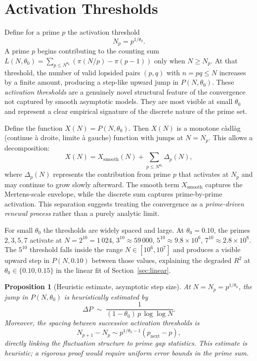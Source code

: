 \documentclass[11pt]{article}
\newtheorem{proposition}{Proposition}
\theoremstyle{definition}
\begin{document}
\section{Activation Thresholds}
\label{sec:activation}

Define for a prime \(p\) the activation threshold
\[
N_p = p^{1/\theta_0}.
\]
A prime \(p\) begins contributing to the counting sum
\(L(N,\theta_0) = \sum_{p \leq N^{\theta_0}} (\pi(N/p) - \pi(p-1))\)
only when \(N \ge N_p\).  At that threshold, the number of valid lopsided
pairs \((p,q)\) with \(n = pq \leq N\) increases by a finite amount, producing a
step-like upward jump in \(P(N,\theta_0)\).  These \emph{activation thresholds} are a
genuinely novel structural feature of the convergence not captured by smooth asymptotic
models.  They are most visible at small \(\theta_0\) and represent a clear empirical
signature of the discrete nature of the prime set.

Define the function \(X(N) = P(N,\theta_0)\).  Then \(X(N)\) is a monotone c\`adl\`ag
(continue \`a droite, limite \`a gauche) function with jumps at
\(N = N_p\).  This allows a decomposition:
\begin{equation}\label{eq:renewal}
  X(N) = X_{\text{smooth}}(N) + \sum_{p \le N^{\theta_0}} \Delta_p(N),
\end{equation}
where \(\Delta_p(N)\) represents the contribution from prime \(p\) that activates at
\(N_p\) and may continue to grow slowly afterward.  The smooth term \(X_{\text{smooth}}\)
captures the Mertens-scale envelope, while the discrete sum captures prime-by-prime
activation.  This separation suggests treating the convergence as a \emph{prime-driven
renewal process} rather than a purely analytic limit.

For small \(\theta_0\) the thresholds are widely spaced and large.  At
\(\theta_0 = 0.10\), the primes \(2,3,5,7\) activate at
\(N = 2^{10} = 1\,024\), \(3^{10} \approx 59\,000\), \(5^{10} \approx 9.8\times10^6\),
\(7^{10} \approx 2.8\times10^8\).  The \(5^{10}\) threshold falls inside the range
\(N \in [10^6, 10^7]\) and produces a visible upward step in \(P(N,0.10)\) between
those values, explaining the degraded \(R^2\) at \(\theta_0 \in \{0.10,0.15\}\) in the
linear fit of Section~\ref{sec:linear}.

\begin{proposition}[Heuristic estimate, asymptotic step size]
\label{prop:step}
At \(N = N_p = p^{1/\theta_0}\), the jump in \(P(N,\theta_0)\) is heuristically estimated by
\[
  \Delta P \;\sim\; \frac{1}{(1-\theta_0)\,p\,\log\log N}.
\]
Moreover, the spacing between successive activation thresholds is
\[
  N_{p+1} - N_p \sim p^{1/\theta_0 - 1} (p_{\text{next}} - p),
\]
directly linking the fluctuation structure to prime gap statistics.
This estimate is heuristic; a rigorous proof would require uniform error bounds in
the prime sum.
\end{proposition}
\end{document}
